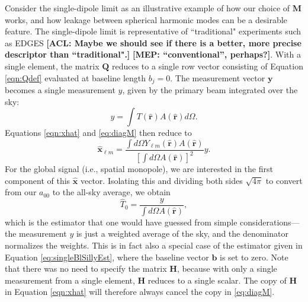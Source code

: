 \documentclass[twolcolumn,apj,iop,numberedappendix]{emulateapj}
\newcommand{\Hmat}{\mathbf{H}}
\newcommand{\M}{\mathbf{M}}
\newcommand{\acl}[1]{{\color{red} \textbf{[ACL:  #1]}}}
\newcommand{\mep}[1]{{\color{applegreen} \textbf{[MEP:  #1]}}}
\begin{document}
Consider the single-dipole limit as an illustrative example of how our choice of $\M$ works, and how leakage between spherical harmonic modes can be a desirable feature. The single-dipole limit is representative of ``traditional" experiments such as EDGES \acl{Maybe we should see if there is a better, more precise descriptor than ``traditional".}\mep{``conventional'', perhaps?}. With a single element, the matrix $\mathbf{Q}$ reduces to a single row vector consisting of Equation \eqref{eqn:Qdef} evaluated at baseline length $b_j=0$. The measurement vector $\mathbf{y}$ becomes a single measurement $y$, given by the primary beam integrated over the sky:
\begin{equation}
y = \int T(\mathbf{\hat{r}}) A(\mathbf{\hat{r}}) d\Omega.
\end{equation}
Equations \eqref{eqn:xhat} and \eqref{eq:diagM} then reduce to
\begin{equation}
\mathbf{\hat{x}}_{\ell m} = \frac{\int d\Omega Y_{\ell m} (\mathbf{\hat{r}}) A(\mathbf{\hat{r}})}{\left[ \int d\Omega A(\mathbf{\hat{r}}) \right]^2} y.
\end{equation}
For the global signal (i.e., spatial monopole), we are interested in the first component of this $\mathbf{\hat{x}}$ vector. Isolating this and dividing both sides $\sqrt{4\pi}$ to convert from our $a_{00}$ to the all-sky average, we obtain
\begin{equation}
\label{eq:singleElementExtraction}
\widehat{T}_0 = \frac{y}{ \int d\Omega A(\mathbf{\hat{r}}) },
\end{equation}
which is the estimator that one would have guessed from simple considerations---the measurement $y$ is just a weighted average of the sky, and the denominator normalizes the weights. This is in fact also a special case of the estimator given in Equation \eqref{eq:singleBlSillyEst}, where the baseline vector $\mathbf{b}$ is set to zero. Note that there was no need to specify the matrix $\Hmat$, because with only a single measurement from a single element, $\Hmat$ reduces to a single scalar. The copy of $\Hmat$ in Equation \eqref{eqn:xhat} will therefore always cancel the copy in \eqref{eq:diagM}.
%
\end{document}
